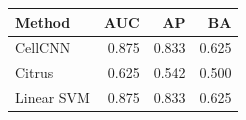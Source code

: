 \begin{tabular}{@{}lrrr@{}}
\toprule
Method & AUC & AP & BA \\
\midrule
CellCNN & 0.875 & 0.833 & 0.625 \\
Citrus & 0.625 & 0.542 & 0.500 \\
Linear SVM & 0.875 & 0.833 & 0.625 \\
\bottomrule
\end{tabular}
